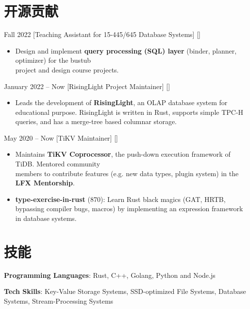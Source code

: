 \documentclass{chicv}
\begin{document}
\section{开源贡献}

  {Fall 2022}
  [Teaching Assistant for 15-445/645 Database Systems]
  []
  \begin{itemize}
    \item Design and implement \textbf{query processing (SQL) layer} (binder, planner, optimizer) for the bustub\\ project and design course projects.
  \end{itemize}

  {January 2022 -- Now}
  [RisingLight Project Maintainer]
  []
  \begin{itemize}
    \item Leads the development of \textbf{RisingLight}, an OLAP database system for educational purpose. RisingLight is written in Rust, supports simple TPC-H queries, and has a merge-tree based columnar storage.
  \end{itemize}

    {May 2020 -- Now}
    [TiKV Maintainer]
    [] %
    \begin{itemize}
      \item Maintains \textbf{TiKV Coprocessor}, the push-down execution framework of TiDB. Mentored community\\ members to contribute features (e.g. new data types, plugin system) in the \textbf{LFX Mentorship}. \ 
    \end{itemize}

\begin{itemize}
  \item \textbf{type-exercise-in-rust} (870):
  {\small Learn Rust black magics (GAT, HRTB, bypassing compiler bugs, macros) by implementing an expression framework in database systems.}
\end{itemize}


\section{技能}

\begin{compactlist}
  \item \textbf{Programming Languages}: Rust, C++, Golang, Python and Node.js
  \item \textbf{Tech Skills}: Key-Value Storage Systems, SSD-optimized File Systems, Database Systems, Stream-Processing Systems
\end{compactlist}
\end{document}
